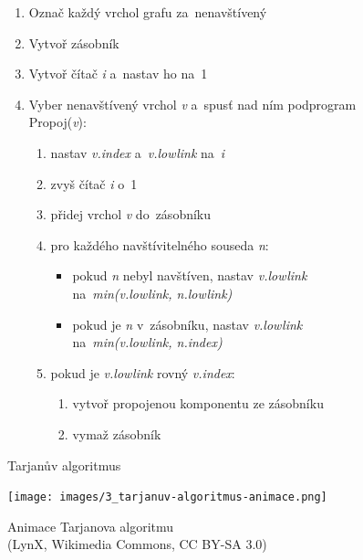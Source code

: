 \begin{figure}[htbp]
\begin{minipage}{0.45\textwidth}
        \onehalfspacing
        \begin{enumerate}
            \item Označ každý vrchol grafu za~nenavštívený
            \item Vytvoř zásobník
            \item Vytvoř čítač \emph{i} a~nastav ho na~1
            \item Vyber nenavštívený vrchol \emph{v} a~spusť nad ním podprogram Propoj(\emph{v}):
                  \begin{enumerate}
                      \item nastav \emph{v.index} a~\emph{v.lowlink} na~\emph{i}
                      \item zvyš čítač \emph{i} o~1
                      \item přidej vrchol \emph{v} do~zásobníku
                      \item pro každého navštívitelného souseda \emph{n}:
                            \begin{itemize}
                                \item pokud \emph{n} nebyl navštíven, nastav \emph{v.lowlink} na~\emph{min(v.lowlink, n.lowlink)}
                                \item pokud je \emph{n} v~zásobníku, nastav \emph{v.lowlink} na~\emph{min(v.lowlink, n.index)}
                            \end{itemize}
                      \item pokud je \emph{v.lowlink} rovný \emph{v.index}:
                            \begin{enumerate}
                                \item vytvoř propojenou komponentu ze zásobníku
                                \item vymaž zásobník
                            \end{enumerate}
                  \end{enumerate}
        \end{enumerate}
        \caption{Tarjanův algoritmus}
        \label{fig:tarjan}
    \end{minipage}
\end{figure}
\FloatBarrier

\begin{figure}[ht]
    \centering
    \texttt{[image: images/3\_tarjanuv-algoritmus-animace.png]}

    \caption[Animace Tarjanova algoritmu]{Animace Tarjanova algoritmu\\{\small (LynX, Wikimedia Commons, CC BY-SA 3.0)}}
\end{figure}

